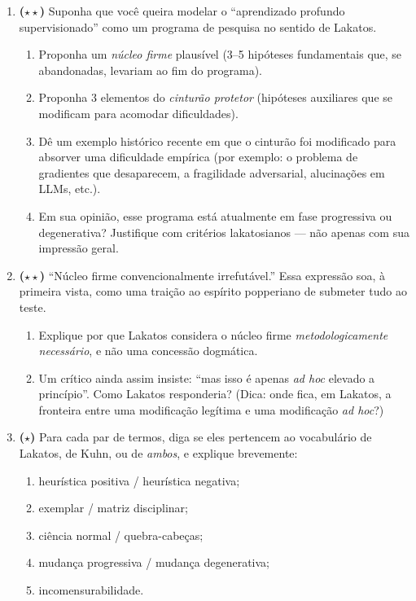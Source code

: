 \documentclass[10pt,a4paper]{extarticle}
\newcommand{\impt}[1]{\textcolor{important}{#1}}
\newcommand{\difi}{$\star$}
\newcommand{\difii}{$\star\star$}
\begin{document}
\begin{enumerate}[label=\textbf{\arabic*.}, leftmargin=*, start=11]

\item \textbf{(\difii)} Suponha que você queira modelar o ``aprendizado profundo supervisionado'' como um \impt{programa de pesquisa} no sentido de Lakatos.

\begin{enumerate}[label=(\alph*)]
    \item Proponha um \emph{núcleo firme} plausível (3--5 hipóteses fundamentais que, se abandonadas, levariam ao fim do programa).
    \item Proponha 3 elementos do \emph{cinturão protetor} (hipóteses auxiliares que se modificam para acomodar dificuldades).
    \item Dê um exemplo histórico recente em que o cinturão foi modificado para absorver uma dificuldade empírica (por exemplo: o problema de gradientes que desaparecem, a fragilidade adversarial, alucinações em LLMs, etc.).
    \item Em sua opinião, esse programa está atualmente em fase \impt{progressiva} ou \impt{degenerativa}? Justifique com critérios lakatosianos --- não apenas com sua impressão geral.
\end{enumerate}

\item \textbf{(\difii)} ``Núcleo firme convencionalmente irrefutável.'' Essa expressão soa, à primeira vista, como uma traição ao espírito popperiano de submeter tudo ao teste.

\begin{enumerate}[label=(\alph*)]
    \item Explique por que Lakatos considera o núcleo firme \emph{metodologicamente necessário}, e não uma concessão dogmática.
    \item Um crítico ainda assim insiste: ``mas isso é apenas \emph{ad hoc} elevado a princípio''. Como Lakatos responderia? (Dica: onde fica, em Lakatos, a fronteira entre uma modificação legítima e uma modificação \emph{ad hoc}?)
\end{enumerate}

\item \textbf{(\difi)} Para cada par de termos, diga se eles pertencem ao vocabulário de Lakatos, de Kuhn, ou de \emph{ambos}, e explique brevemente:

\begin{enumerate}[label=(\alph*)]
    \item heurística positiva / heurística negativa;
    \item exemplar / matriz disciplinar;
    \item ciência normal / quebra-cabeças;
    \item mudança progressiva / mudança degenerativa;
    \item incomensurabilidade.
\end{enumerate}


\end{enumerate}
\end{document}
